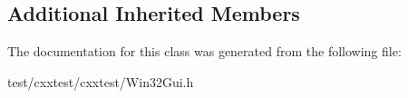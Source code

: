 \subsection*{Additional Inherited Members}


The documentation for this class was generated from the following file\-:\begin{DoxyCompactItemize}
\item 
test/cxxtest/cxxtest/Win32\-Gui.\-h\end{DoxyCompactItemize}
